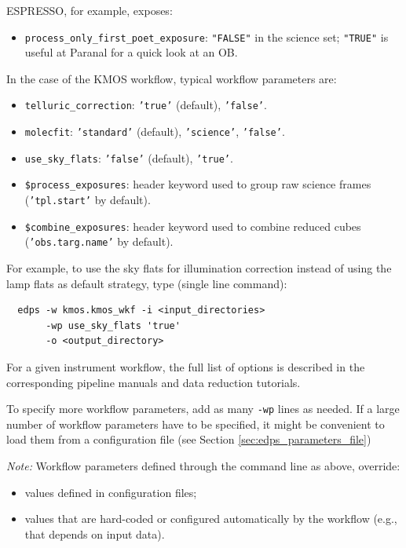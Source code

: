 ESPRESSO, for example, exposes:
\begin{itemize}
    \item {\tt process\_only\_first\_poet\_exposure}: {\tt "FALSE"} in the science set; {\tt "TRUE"} is useful at Paranal for a quick look at an OB.
\end{itemize}

In the case of the KMOS workflow, typical workflow parameters are:
\begin{itemize}
    \item {\tt telluric\_correction}: {\tt 'true'} (default), {\tt 'false'}.
    \item {\tt molecfit}: {\tt 'standard'} (default), {\tt 'science'}, {\tt 'false'}.
    \item {\tt use\_sky\_flats}: {\tt 'false'} (default), {\tt 'true'}.
    \item {\tt \$process\_exposures}: header keyword used to group raw science frames ({\tt 'tpl.start'} by default).
    \item {\tt \$combine\_exposures}: header keyword used to combine reduced cubes ({\tt 'obs.targ.name'} by default).
    
\end{itemize}

For example, to use the sky flats for illumination correction instead of using the lamp flats as default strategy, type (single line command):
\begin{verbatim}
  edps -w kmos.kmos_wkf -i <input_directories> 
       -wp use_sky_flats 'true'
       -o <output_directory> 
\end{verbatim}

For a given instrument workflow, the full list of options is described in the corresponding pipeline manuals and data reduction tutorials.


To specify more workflow parameters, add as many {\tt -wp} lines as needed. If a large number of workflow parameters have to be specified, it might be convenient to  load them from a configuration file (see Section \ref{sec:edps_parameters_file})

{\it Note:} Workflow parameters defined  through the command line as above, override:
\begin{itemize}
    \item values defined in configuration files;
    \item values that are hard-coded or configured automatically by the workflow (e.g., that depends on input data).
\end{itemize}



